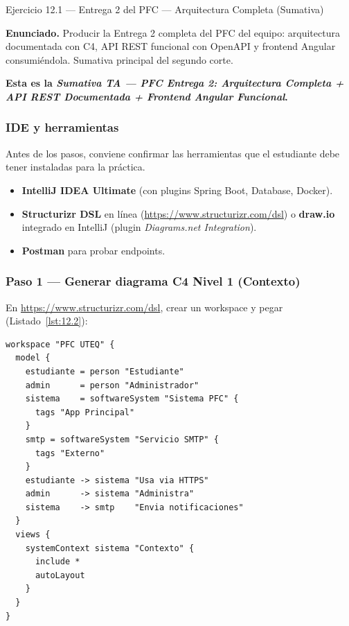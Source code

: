 \begin{cajaejercicio}{Ejercicio 12.1 --- Entrega 2 del PFC --- Arquitectura Completa (Sumativa)}


\textbf{Enunciado.} Producir la Entrega 2 completa del PFC del equipo: arquitectura documentada con C4, API REST funcional con OpenAPI y frontend Angular consumiéndola. Sumativa principal del segundo corte.

\textbf{Esta es la \emph{Sumativa TA --- PFC Entrega 2: Arquitectura
Completa + API REST Documentada + Frontend Angular Funcional}.}

\subsubsection*{IDE y herramientas}

Antes de los pasos, conviene confirmar las herramientas que
el estudiante debe tener instaladas para la práctica.


\begin{itemize}
\item \textbf{IntelliJ IDEA Ultimate} (con plugins Spring Boot,
Database, Docker).
\item \textbf{Structurizr DSL} en línea (\url{https://www.structurizr.com/dsl})
o \textbf{draw.io} integrado en IntelliJ
(plugin \emph{Diagrams.net Integration}).
\item \textbf{Postman} para probar endpoints.
\end{itemize}

\subsubsection*{Paso 1 --- Generar diagrama C4 Nivel 1 (Contexto)}

En \url{https://www.structurizr.com/dsl}, crear un workspace y pegar (Listado~\ref{lst:12.2}):

\begin{lstlisting}[style=shell,numbers=none,caption={Ejemplo de Shell},label=lst:12.2]
workspace "PFC UTEQ" {
  model {
    estudiante = person "Estudiante"
    admin      = person "Administrador"
    sistema    = softwareSystem "Sistema PFC" {
      tags "App Principal"
    }
    smtp = softwareSystem "Servicio SMTP" {
      tags "Externo"
    }
    estudiante -> sistema "Usa via HTTPS"
    admin      -> sistema "Administra"
    sistema    -> smtp    "Envia notificaciones"
  }
  views {
    systemContext sistema "Contexto" {
      include *
      autoLayout
    }
  }
}
\end{lstlisting}


\end{cajaejercicio}
